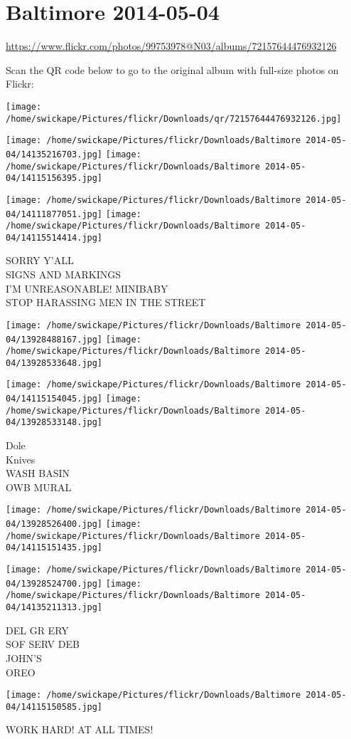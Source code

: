 \documentclass[10pt,letterpaper]{article}
\title{}
\author{}
\date{}
\begin{document}
\section*{Baltimore 2014-05-04}

\url{https://www.flickr.com/photos/99753978@N03/albums/72157644476932126}

Scan the QR code below to go to the original album with full-size photos on Flickr:

\texttt{[image: /home/swickape/Pictures/flickr/Downloads/qr/72157644476932126.jpg]}
\pagebreak

\texttt{[image: /home/swickape/Pictures/flickr/Downloads/Baltimore 2014-05-04/14135216703.jpg]}
\texttt{[image: /home/swickape/Pictures/flickr/Downloads/Baltimore 2014-05-04/14115156395.jpg]}

\texttt{[image: /home/swickape/Pictures/flickr/Downloads/Baltimore 2014-05-04/14111877051.jpg]}
\texttt{[image: /home/swickape/Pictures/flickr/Downloads/Baltimore 2014-05-04/14115514414.jpg]}

SORRY Y'ALL\\
SIGNS AND MARKINGS\\
I'M UNREASONABLE! MINIBABY\\
STOP HARASSING MEN IN THE STREET
\pagebreak

\texttt{[image: /home/swickape/Pictures/flickr/Downloads/Baltimore 2014-05-04/13928488167.jpg]}
\texttt{[image: /home/swickape/Pictures/flickr/Downloads/Baltimore 2014-05-04/13928533648.jpg]}

\texttt{[image: /home/swickape/Pictures/flickr/Downloads/Baltimore 2014-05-04/14115154045.jpg]}
\texttt{[image: /home/swickape/Pictures/flickr/Downloads/Baltimore 2014-05-04/13928533148.jpg]}

Dole\\
Knives\\
WASH BASIN\\
OWB MURAL
\pagebreak

\texttt{[image: /home/swickape/Pictures/flickr/Downloads/Baltimore 2014-05-04/13928526400.jpg]}
\texttt{[image: /home/swickape/Pictures/flickr/Downloads/Baltimore 2014-05-04/14115151435.jpg]}

\texttt{[image: /home/swickape/Pictures/flickr/Downloads/Baltimore 2014-05-04/13928524700.jpg]}
\texttt{[image: /home/swickape/Pictures/flickr/Downloads/Baltimore 2014-05-04/14135211313.jpg]}

DEL GR ERY\\
SOF SERV DEB\\
JOHN'S\\
OREO
\pagebreak

\texttt{[image: /home/swickape/Pictures/flickr/Downloads/Baltimore 2014-05-04/14115150585.jpg]}

WORK HARD!  AT ALL TIMES!
\pagebreak
\end{document}
